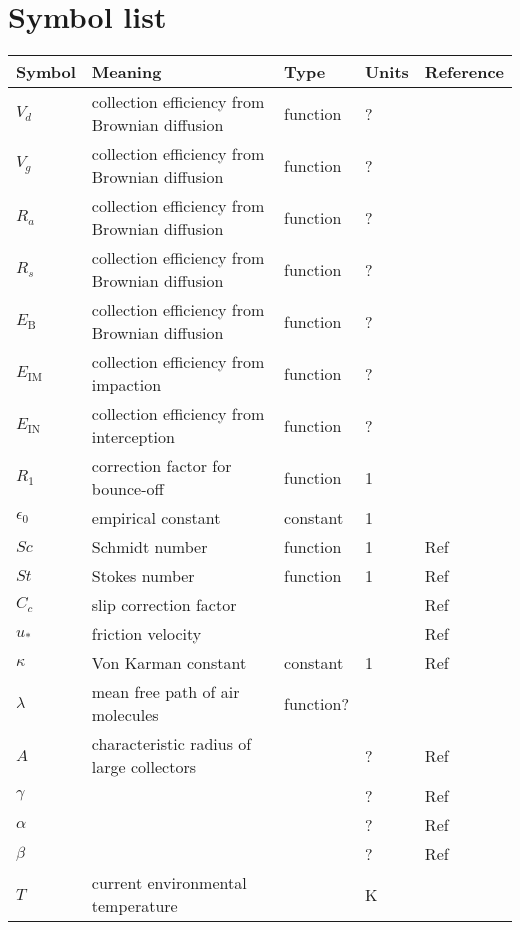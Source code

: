 \documentclass{article}
\begin{document}
\section{Symbol list}
\label{sec:symbol-list}

\newcommand{\rr}{\raggedright}
\newcommand{\tn}{\tabularnewline\hline}
\renewcommand{\arraystretch}{1.5}
\begin{longtable}{|l|p{5.5cm}|l|l|p{4.5cm}|}
\hline \textbf{Symbol} & \textbf{Meaning}                                                       & \textbf{Type} & \textbf{Units}                        &  \textbf{Reference}                                \tn
\hline \endhead
$V_d$  & \rr collection efficiency from Brownian diffusion  & function         & ?    &                                                    \tn
$V_g$  & \rr collection efficiency from Brownian diffusion  & function         & ?    &                                                    \tn
$R_a$  & \rr collection efficiency from Brownian diffusion  & function         & ?    &                                                    \tn
$R_s$  & \rr collection efficiency from Brownian diffusion  & function         & ?    &                                                    \tn

$E_{\textrm{B}}$  & \rr collection efficiency from Brownian diffusion  & function         & ?    &                                                    \tn
$E_{\textrm{IM}}$  & \rr collection efficiency from impaction  & function         & ?    &                                                    \tn
$E_{\textrm{IN}}$  & \rr collection efficiency from interception & function         & ?    &                                                    \tn

$R_1$  & \rr correction factor for bounce-off  & function         &  1    &                                                    \tn
$\epsilon_0$  & \rr empirical constant  & constant         & 1   &                      \tn

$ Sc $ & \rr Schmidt number & function & 1 & Ref \tn
$ St$ & \rr Stokes number & function & 1 & Ref \tn
$C_c$ & \rr slip correction factor & & & Ref \tn

$u_*$ & \rr friction velocity & & & Ref \tn
$ \kappa $ & \rr Von Karman constant & constant & 1 & Ref \tn
$\lambda$ & mean free path of air molecules & function? &  \tn
$A$ & characteristic radius of large collectors  &   & ?    &    Ref   \tn
$\gamma$  &  &   & ?    &    Ref   \tn
$\alpha$ &  &   & ?    &    Ref   \tn
$\beta$ & & & ? & Ref \tn
$T$ & current environmental temperature &  & K & \tn
\end{longtable}
\end{document}
